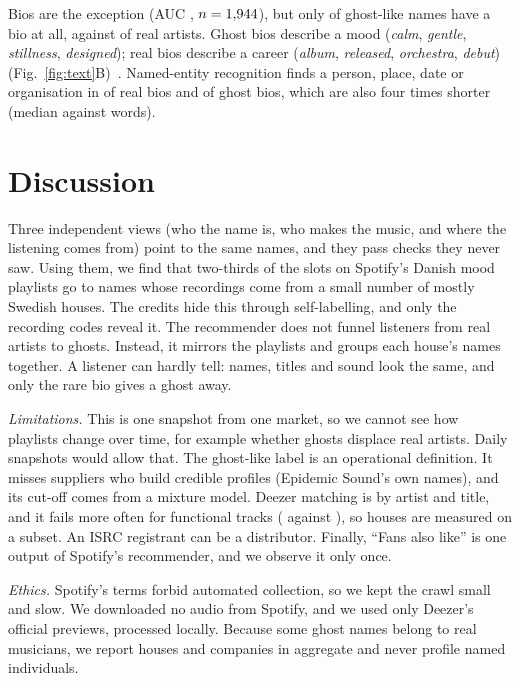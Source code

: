 \documentclass[9pt,twocolumn,twoside]{pnas-new}
\begin{document}
Bios are the exception (AUC \aucBio, $n=1{,}944$), but only \bioGhost{} of ghost-like names have a bio at all, against \bioReal{} of real artists. Ghost bios describe a mood (\emph{calm}, \emph{gentle}, \emph{stillness}, \emph{designed}); real bios describe a career (\emph{album}, \emph{released}, \emph{orchestra}, \emph{debut}) (Fig.~\ref{fig:text}B)~\cite{monroe2008fightin}. Named-entity recognition finds a person, place, date or organisation in \entReal{} of real bios and \entGhost{} of ghost bios, which are also four times shorter (median \tokGhost{} against \tokReal{} words).



\section*{Discussion}
Three independent views (who the name is, who makes the music, and where the listening comes from) point to the same names, and they pass checks they never saw. Using them, we find that two-thirds of the slots on Spotify's Danish mood playlists go to names whose recordings come from a small number of mostly Swedish houses. The credits hide this through self-labelling, and only the recording codes reveal it. The recommender does not funnel listeners from real artists to ghosts. Instead, it mirrors the playlists and groups each house's names together. A listener can hardly tell: names, titles and sound look the same, and only the rare bio gives a ghost away.

\emph{Limitations.} This is one snapshot from one market, so we cannot see how playlists change over time, for example whether ghosts displace real artists. Daily snapshots would allow that. The ghost-like label is an operational definition. It misses suppliers who build credible profiles (Epidemic Sound's own names), and its cut-off comes from a mixture model. Deezer matching is by artist and title, and it fails more often for functional tracks (\deezerMatchF{} against \deezerMatchG), so houses are measured on a subset. An ISRC registrant can be a distributor. Finally, ``Fans also like'' is one output of Spotify's recommender, and we observe it only once.

\emph{Ethics.} Spotify's terms forbid automated collection, so we kept the crawl small and slow. We downloaded no audio from Spotify, and we used only Deezer's official previews, processed locally. Because some ghost names belong to real musicians, we report houses and companies in aggregate and never profile named individuals.
\end{document}
